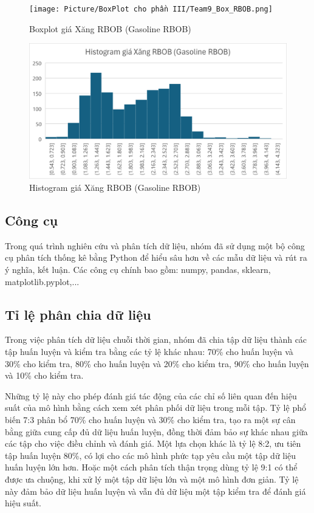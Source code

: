 \documentclass[conference]{IEEEtran}
\begin{document}
\begin{figure}[H]
    \centering
    \begin{minipage}{0.23\textwidth}
    \centering
    \texttt{[image: Picture/BoxPlot cho phần III/Team9\_Box\_RBOB.png]}
    \caption{Boxplot giá Xăng RBOB (Gasoline RBOB)}
    \label{fig:1}
    \end{minipage}
    \hfill
    \begin{minipage}{0.23\textwidth}
    \centering
    \includegraphics[width=1\textwidth]{Picture/Histogram cho ở phần III/Team9_His_RBOB.png}
    \caption{Histogram giá Xăng RBOB (Gasoline RBOB)}
    \label{fig:2}
    \end{minipage}
\end{figure}
\subsection{Công cụ}
Trong quá trình nghiên cứu và phân tích dữ liệu, nhóm đã sử dụng một bộ công cụ phân tích thống kê bằng Python để hiểu sâu hơn về các mẫu dữ liệu và rút ra ý nghĩa, kết luận. Các công cụ chính bao gồm: numpy, pandas, sklearn, matplotlib.pyplot,...


\subsection{Tỉ lệ phân chia dữ liệu}
    Trong việc phân tích dữ liệu chuỗi thời gian, nhóm đã chia tập dữ liệu thành các tập huấn luyện và kiểm tra bằng các tỷ lệ khác nhau: 70\% cho huấn luyện và 30\% cho kiểm tra, 80\% cho huấn luyện và 20\% cho kiểm tra, 90\% cho huấn luyện và 10\% cho kiểm tra. 

Những tỷ lệ này cho phép đánh giá tác động của các chỉ số liên quan đến hiệu suất của mô hình bằng cách xem xét phân phối dữ liệu trong mỗi tập. Tỷ lệ phổ biến 7:3 phân bổ 70\% cho huấn luyện và 30\% cho kiểm tra, tạo ra một sự cân bằng giữa cung cấp đủ dữ liệu huấn luyện, đồng thời đảm bảo sự khác nhau giữa các tập cho việc điều chỉnh và đánh giá. Một lựa chọn khác là tỷ lệ 8:2, ưu tiên tập huấn luyện 80\%, có lợi cho các mô hình phức tạp yêu cầu một tập dữ liệu huấn luyện lớn hơn. Hoặc một cách phân tích thận trọng dùng tỷ lệ 9:1 có thể được ưa chuộng, khi xử lý một tập dữ liệu lớn và một mô hình đơn giản. Tỷ lệ này đảm bảo dữ liệu huấn luyện và vẫn đủ dữ liệu một tập kiểm tra để đánh giá hiệu suất.
\end{document}
